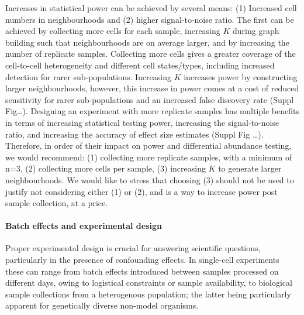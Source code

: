\documentclass[
]{article}
\begin{document}
Increases in statistical power can be achieved by several means: (1) Increased cell numbers in neighbourhoods and (2) higher signal-to-noise ratio. The first can
be achieved by collecting more cells for each sample, increasing \(K\) during graph building such that neighbourhoods are on average larger, and by increasing the
number of replicate samples. Collecting more cells gives a greater coverage of the cell-to-cell heterogeneity and different cell states/types, including increased
detection for rarer sub-populations. Increasing \(K\) increases power by constructing larger neighbourhoods, however, this increase in power comes at a cost of
reduced sensitivity for rarer sub-populations and an increased false discovery rate (Suppl Fig\ldots). Designing an experiment with more replicate samples has
multiple benefits in terms of increasing statistical testing power, increasing the signal-to-noise ratio, and increasing the accuracy of effect size estimates
(Suppl Fig \ldots). Therefore, in order of their impact on power and differential abundance testing, we would recommend: (1) collecting more replicate samples, with
a minimum of n=3, (2) collecting more cells per sample, (3) increasing \(K\) to generate larger neighbourhoods. We would like to stress that choosing (3) should not
be used to justify not considering either (1) or (2), and is a way to increase power post sample collection, at a price.

\hypertarget{batch-effects-and-experimental-design}{%
\paragraph*{Batch effects and experimental design}\label{batch-effects-and-experimental-design}}

Proper experimental design is crucial for answering scientific questions, particularly in the presence of confounding effects. In single-cell experiments these
can range from batch effects introduced between samples processed on different days, owing to logistical constraints or sample availability, to biological sample
collections from a heterogenous population; the latter being particularly apparent for genetically diverse non-model organisms.
\end{document}
